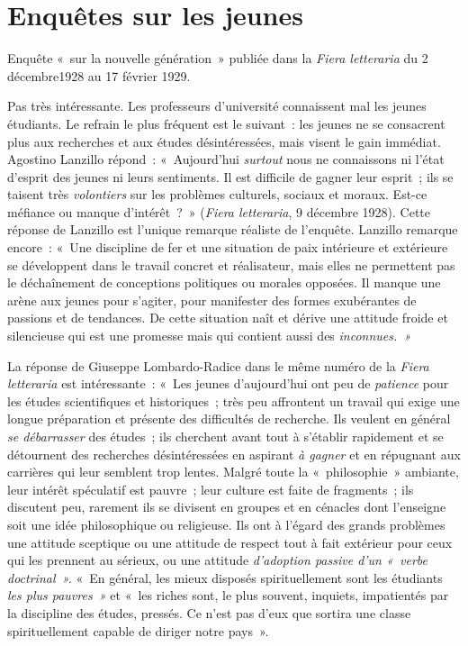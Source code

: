 \documentclass[french,twoside]{book} %
\begin{document}
\section[{Enquêtes sur les jeunes}]{Enquêtes sur les jeunes}
\noindent Enquête « sur la nouvelle génération » publiée dans la \emph{Fiera letteraria} du 2 décembre1928 au 17 février 1929.\par
Pas très intéressante. Les professeurs d’université connaissent mal les jeunes étudiants. Le refrain le plus fréquent est le suivant : les jeunes ne se consacrent plus aux recherches et aux études désintéressées, mais visent le gain immédiat. Agostino Lanzillo répond : « Aujourd’hui \emph{surtout} nous ne connaissons ni l’état d’esprit des jeunes ni leurs sentiments. Il est difficile de gagner leur esprit ; ils se taisent très \emph{volontiers} sur les problèmes culturels, sociaux et moraux. Est-ce méfiance ou manque d’intérêt ? » (\emph{Fiera letteraria}, 9 décembre 1928). Cette réponse de Lanzillo est l’unique remarque réaliste de l’enquête. Lanzillo remarque encore : « Une discipline de fer et une situation de paix intérieure et extérieure se développent dans le travail concret et réalisateur, mais elles ne permettent pas le déchaînement de conceptions politiques ou morales opposées. Il manque une arène aux jeunes pour s’agiter, pour manifester des formes exubérantes de passions et de tendances. De cette situation naît et dérive une attitude froide et silencieuse qui est une promesse mais qui contient aussi des \emph{inconnues. »}\par
La réponse de Giuseppe Lombardo-Radice dans le même numéro de la \emph{Fiera letteraria} est intéressante : « Les jeunes d’aujourd’hui ont peu de \emph{patience} pour les études scientifiques et historiques ; très peu affrontent un travail qui exige une longue préparation et présente des difficultés de recherche. Ils veulent en général \emph{se débarrasser} des études ; ils cherchent avant tout à s’établir rapidement et se détournent des recherches désintéressées en aspirant \emph{à gagner} et en répugnant aux carrières qui leur semblent trop lentes. Malgré toute la « philosophie » ambiante, leur intérêt spéculatif est pauvre ; leur culture est faite de fragments ; ils discutent peu, rarement ils se divisent en groupes et en cénacles dont l’enseigne soit une idée philosophique ou religieuse. Ils ont à l’égard des grands problèmes une attitude sceptique ou une attitude de respect tout à fait extérieur pour ceux qui les prennent au sérieux, ou une attitude \emph{d’adoption passive d’un « verbe doctrinal ». } « En général, les mieux disposés spirituellement sont les étudiants \emph{les plus pauvres »} et « les riches sont, le plus souvent, inquiets, impatientés par la discipline des études, pressés. Ce n’est pas d’eux que sortira une classe spirituellement capable de diriger notre pays ».\par
\end{document}

